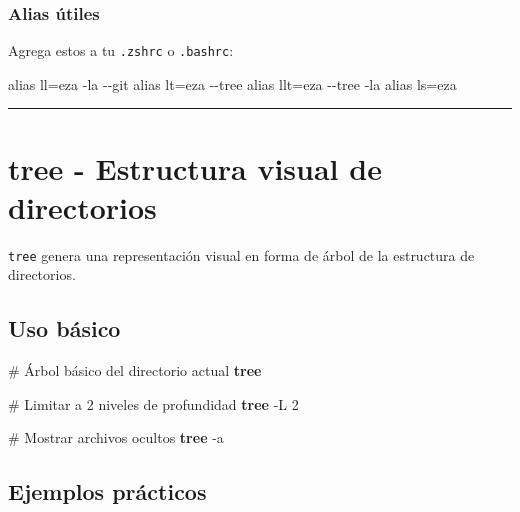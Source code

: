 \documentclass[
  11pt,
  letterpaper,
  oneside,
  openany]{scrbook}
\newenvironment{Shaded}{}{}
\newcommand{\AttributeTok}[1]{\textcolor[rgb]{0.84,0.23,0.29}{#1}}
\newcommand{\BuiltInTok}[1]{\textcolor[rgb]{0.84,0.23,0.29}{#1}}
\newcommand{\CommentTok}[1]{\textcolor[rgb]{0.42,0.45,0.49}{#1}}
\newcommand{\ExtensionTok}[1]{\textcolor[rgb]{0.84,0.23,0.29}{\textbf{#1}}}
\newcommand{\NormalTok}[1]{\textcolor[rgb]{0.14,0.16,0.18}{#1}}
\newcommand{\StringTok}[1]{\textcolor[rgb]{0.01,0.18,0.38}{#1}}
\begin{document}
\subsubsection{Alias útiles}\label{alias-uxfatiles}

Agrega estos a tu \texttt{.zshrc} o \texttt{.bashrc}:

\begin{Shaded}
\begin{Highlighting}[]
\BuiltInTok{alias}\NormalTok{ ll=}\StringTok{\textquotesingle{}eza {-}la {-}{-}git\textquotesingle{}}
\BuiltInTok{alias}\NormalTok{ lt=}\StringTok{\textquotesingle{}eza {-}{-}tree\textquotesingle{}}
\BuiltInTok{alias}\NormalTok{ llt=}\StringTok{\textquotesingle{}eza {-}{-}tree {-}la\textquotesingle{}}
\BuiltInTok{alias}\NormalTok{ ls=}\StringTok{\textquotesingle{}eza\textquotesingle{}}
\end{Highlighting}
\end{Shaded}

\begin{center}\rule{0.5\linewidth}{0.5pt}\end{center}

\section{tree - Estructura visual de directorios}\label{sec-tree}

\texttt{tree} genera una representación visual en forma de árbol de la
estructura de directorios.

\subsection{Uso básico}\label{uso-buxe1sico-1}

\begin{Shaded}
\begin{Highlighting}[]
\CommentTok{\# Árbol básico del directorio actual}
\ExtensionTok{tree}

\CommentTok{\# Limitar a 2 niveles de profundidad}
\ExtensionTok{tree} \AttributeTok{{-}L}\NormalTok{ 2}

\CommentTok{\# Mostrar archivos ocultos}
\ExtensionTok{tree} \AttributeTok{{-}a}
\end{Highlighting}
\end{Shaded}

\subsection{Ejemplos prácticos}\label{ejemplos-pruxe1cticos-1}
\end{document}
